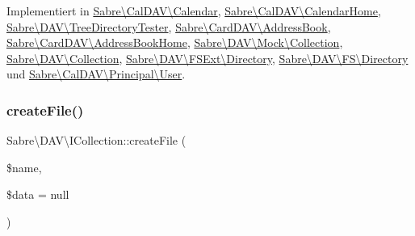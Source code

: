 Implementiert in \mbox{\hyperlink{class_sabre_1_1_cal_d_a_v_1_1_calendar_a3b7a4211a2077bce91c8e369b35279d7}{Sabre\textbackslash{}\+Cal\+D\+A\+V\textbackslash{}\+Calendar}}, \mbox{\hyperlink{class_sabre_1_1_cal_d_a_v_1_1_calendar_home_af17460f3f37b15f588e86d24a2c83d07}{Sabre\textbackslash{}\+Cal\+D\+A\+V\textbackslash{}\+Calendar\+Home}}, \mbox{\hyperlink{class_sabre_1_1_d_a_v_1_1_tree_directory_tester_ad78897c04381c71772aab8c6d16adfea}{Sabre\textbackslash{}\+D\+A\+V\textbackslash{}\+Tree\+Directory\+Tester}}, \mbox{\hyperlink{class_sabre_1_1_card_d_a_v_1_1_address_book_a0a262a569151f7c6ea00dab8b1eb6401}{Sabre\textbackslash{}\+Card\+D\+A\+V\textbackslash{}\+Address\+Book}}, \mbox{\hyperlink{class_sabre_1_1_card_d_a_v_1_1_address_book_home_aa96416a748fd5423662ad389f75ed5ef}{Sabre\textbackslash{}\+Card\+D\+A\+V\textbackslash{}\+Address\+Book\+Home}}, \mbox{\hyperlink{class_sabre_1_1_d_a_v_1_1_mock_1_1_collection_a48e2f0896c892cdc0c3c6fe87b9da153}{Sabre\textbackslash{}\+D\+A\+V\textbackslash{}\+Mock\textbackslash{}\+Collection}}, \mbox{\hyperlink{class_sabre_1_1_d_a_v_1_1_collection_a575855fe925f4aae78a6a5fd829029ff}{Sabre\textbackslash{}\+D\+A\+V\textbackslash{}\+Collection}}, \mbox{\hyperlink{class_sabre_1_1_d_a_v_1_1_f_s_ext_1_1_directory_a14dbd580c21095860343679d4a407b41}{Sabre\textbackslash{}\+D\+A\+V\textbackslash{}\+F\+S\+Ext\textbackslash{}\+Directory}}, \mbox{\hyperlink{class_sabre_1_1_d_a_v_1_1_f_s_1_1_directory_ad12fb8ed1ed2c09ecf644068f349a0c8}{Sabre\textbackslash{}\+D\+A\+V\textbackslash{}\+F\+S\textbackslash{}\+Directory}} und \mbox{\hyperlink{class_sabre_1_1_cal_d_a_v_1_1_principal_1_1_user_a333444a54f6dca549deb3013bb15c191}{Sabre\textbackslash{}\+Cal\+D\+A\+V\textbackslash{}\+Principal\textbackslash{}\+User}}.

\mbox{\label{interface_sabre_1_1_d_a_v_1_1_i_collection_a837d88dac548706770368200f83c2ebc}} 
\subsubsection{\texorpdfstring{create\+File()}{createFile()}}
{\footnotesize\ttfamily Sabre\textbackslash{}\+D\+A\+V\textbackslash{}\+I\+Collection\+::create\+File (\begin{DoxyParamCaption}\item[{}]{\$name,  }\item[{}]{\$data = {\ttfamily null} }\end{DoxyParamCaption})}

